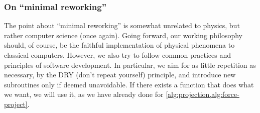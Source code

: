\subsubsection{On \enquote{minimal reworking}}
The point about \enquote{minimal reworking} is somewhat unrelated to
physics, but rather computer science (once again). Going forward, our working
philosophy should, of course, be the faithful implementation of physical
phenomena to classical computers. However, we also try to follow common
practices and principles of software development. In particular, we aim for as
little repetition as necessary, by the DRY (don't repeat yourself) principle,
and introduce new subroutines only if deemed unavoidable. If there exists a
function that does what we want, we will use it, as we have already done for
\cref{alg:projection,alg:force-project}. 

